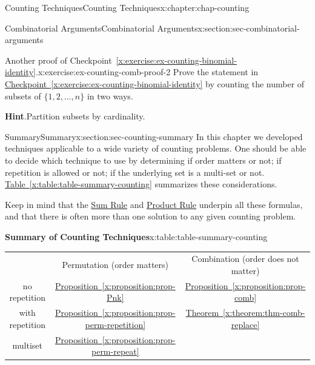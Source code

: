 \documentclass[oneside,10pt,]{book}
\newcommand{\blocktitlefont}{\relax}
\newcommand{\tabularfont}{\relax}
\newcommand{\xreffont}{\relax}
\numberwithin{equation}{section}
\newcommand{\hrulemedium}{\noalign{\hrule height 0.07em}}
\begin{document}
\begin{chapterptx}{Counting Techniques}{}{Counting Techniques}{}{}{x:chapter:chap-counting}
\begin{sectionptx}{Combinatorial Arguments}{}{Combinatorial Arguments}{}{}{x:section:sec-combinatorial-arguments}
\begin{inlineexercise}{Another proof of Checkpoint~{\xreffont\ref*{x:exercise:ex-counting-binomial-identity}}.}{x:exercise:ex-counting-comb-proof-2}%
Prove the statement in \hyperref[x:exercise:ex-counting-binomial-identity]{Checkpoint~{\xreffont\ref{x:exercise:ex-counting-binomial-identity}}} by counting the number of subsets of \(\{1,2,\ldots,n\}\) in two ways.%
\par\smallskip%
\noindent\textbf{\blocktitlefont Hint}.\hypertarget{g:hint:id477798}{}\quad{}Partition subsets by cardinality.%
\end{inlineexercise}
\end{sectionptx}
%
%
\typeout{************************************************}
\typeout{************************************************}
%
\begin{sectionptx}{Summary}{}{Summary}{}{}{x:section:sec-counting-summary}
In this chapter we developed techniques applicable to a wide variety of counting problems. One should be able to decide which technique to use by determining if order matters or not; if repetition is allowed or not; if the underlying set is a multi-set or not. \hyperref[x:table:table-summary-counting]{Table~{\xreffont\ref{x:table:table-summary-counting}}} summarizes these considerations.%
\par
Keep in mind that the \hyperref[x:principle:prin-sum-rule]{Sum Rule} and \hyperref[x:principle:prin-prod-rule]{Product Rule} underpin all these formulas, and that there is often more than one solution to any given counting problem.%
\begin{tableptx}{\textbf{Summary of Counting Techniques}}{x:table:table-summary-counting}{}%
\centering
{\tabularfont%
\begin{tabular}{ccc}
&Permutation (order matters)&Combination (order does not matter)\tabularnewline\hrulemedium
no repetition&\hyperref[x:proposition:prop-Pnk]{Proposition~{\xreffont\ref{x:proposition:prop-Pnk}}}&\hyperref[x:proposition:prop-comb]{Proposition~{\xreffont\ref{x:proposition:prop-comb}}}\tabularnewline[0pt]
with repetition&\hyperref[x:proposition:prop-perm-repetition]{Proposition~{\xreffont\ref{x:proposition:prop-perm-repetition}}}&\hyperref[x:theorem:thm-comb-replace]{Theorem~{\xreffont\ref{x:theorem:thm-comb-replace}}}\tabularnewline[0pt]
multiset&\hyperref[x:proposition:prop-perm-repeat]{Proposition~{\xreffont\ref{x:proposition:prop-perm-repeat}}}&\textendash{} \textendash{} \textendash{} \textendash{} \textendash{}
\end{tabular}
}
\end{tableptx}
\end{sectionptx}
\end{chapterptx}
\end{document}
